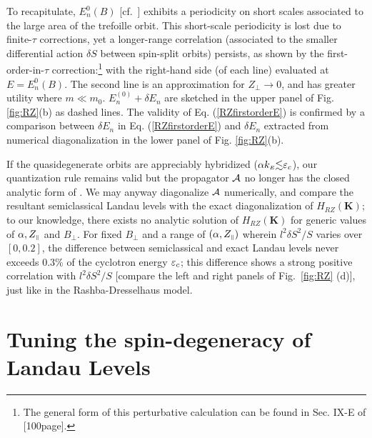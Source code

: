 \documentclass[aps, prb, showpacs, twocolumn, notitlepage, superscriptaddress]{revtex4-1}
\begin{document}
To recapitulate, $E_n^0(B)$ [cf.\ ] exhibits a periodicity on short scales associated to the large area of the trefoille orbit. This short-scale periodicity is lost due to  finite-$\tau$ corrections, yet a longer-range correlation (associated to the smaller differential action $\delta S$ between spin-split orbits) persists, as shown by the first-order-in-$\tau$ correction:\footnote{The general form of this perturbative calculation can be found in Sec. IX-E of [100page].} 
with the right-hand side (of each line) evaluated at $E{=}E_n^0(B)$. The second line is an approximation for $Z_{\perp}{\rightarrow}0$, and has greater utility where $m{\ll}m_0$. $E_n^{(0)}+\delta E_n$ are sketched in the upper panel of Fig. \ref{fig:RZ}(b) as dashed lines. The validity of Eq. (\ref{RZfirstorderE}) is confirmed by a comparison between $\delta E_n$ in Eq. (\ref{RZfirstorderE}) and $\delta E_n$ extracted from numerical diagonalization in the lower panel of Fig. \ref{fig:RZ}(b).

If the quasidegenerate orbits are appreciably hybridized ($\alpha k_{\scriptscriptstyle{E}}{\lesssim}\varepsilon_c$), our quantization rule  remains valid but the propagator ${\cal A}$ no longer has the closed analytic form of . We may anyway diagonalize ${\cal A}$ numerically, and compare the resultant semiclassical Landau levels with the exact diagonalization of $H_{RZ}(\boldsymbol{K})$; to our knowledge, there exists no analytic solution of $H_{RZ}(\boldsymbol{K})$ for generic values of $\alpha,Z_{\scriptscriptstyle{\parallel}}$ and $B_{\perp}$. For fixed  $B_{\perp}$ and a range of $(\alpha,Z_{\scriptscriptstyle{\parallel}})$ wherein  $l^2\delta S^2/S$ varies over $[0,0.2]$, the difference between semiclassical and exact Landau levels never exceeds  0.3\% of the cyclotron energy $\varepsilon_c$; this difference shows a strong positive correlation with $l^2\delta S^2/S$ [compare the left and right panels of Fig.\ \ref{fig:RZ} (d)], just like in the Rashba-Dresselhaus model. 

\section{Tuning the spin-degeneracy of Landau Levels}\label{sec:llquasideg}
\end{document}
